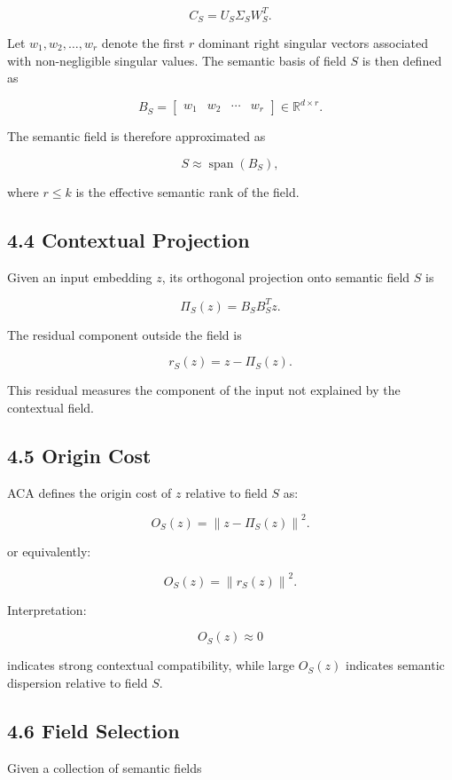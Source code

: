 \documentclass[11pt]{article}
\begin{document}
$$
C_S
=
U_S\Sigma_S W_S^{T}.
$$

Let $w_1,w_2,\dots,w_r$ denote the first $r$ dominant right singular vectors associated with non-negligible singular values. The semantic basis of field $S$ is then defined as

$$
B_S
=
\begin{bmatrix}
w_1 & w_2 & \cdots & w_r
\end{bmatrix}
\in\mathbb{R}^{d\times r}.
$$

The semantic field is therefore approximated as

$$
S
\approx
\operatorname{span}(B_S),
$$

where $r\leq k$ is the effective semantic rank of the field.

\subsection{4.4 Contextual Projection}

Given an input embedding $z$, its orthogonal projection onto semantic field $S$ is

$$
\Pi_S(z)
=
B_S B_S^{T} z.
$$

The residual component outside the field is

$$
r_S(z)
=
z-\Pi_S(z).
$$

This residual measures the component of the input not explained by the contextual field.

\subsection{4.5 Origin Cost}

ACA defines the origin cost of $z$ relative to field $S$ as:

$$
O_S(z)
=
\left\lVert z-\Pi_S(z)\right\rVert^2.
$$

or equivalently:

$$
O_S(z)
=
\left\lVert r_S(z)\right\rVert^2.
$$

Interpretation:

$$
O_S(z)\approx 0
$$

indicates strong contextual compatibility, while large $O_S(z)$ indicates semantic dispersion relative to field $S$.

\subsection{4.6 Field Selection}

Given a collection of semantic fields
\end{document}
